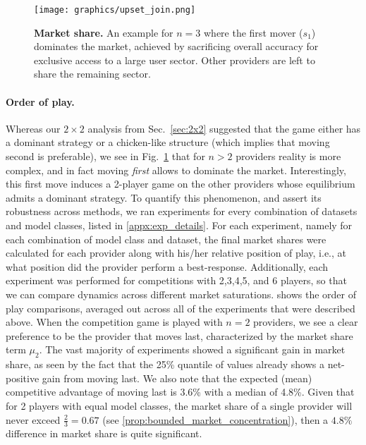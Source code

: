 



\begin{figure}[t!]
\centering
\texttt{[image: graphics/upset\_join.png]}
\caption{%
\textbf{Market share.}
An example for $n=3$ where the first mover ($s_1$) dominates the market,
achieved by sacrificing overall accuracy for exclusive access to a large user sector.
Other providers are left to share the remaining sector.
}
\label{fig:upset}
\end{figure}
 \paragraph{Order of play.}
Whereas our $2\times2$ analysis from Sec.~\ref{sec:2x2}
suggested that the game either has a dominant strategy or a chicken-like structure
(which implies that moving second is preferable),
we see in Fig.~\ref{fig:upset} that for $n>2$ providers  reality is more complex, and in fact moving \emph{first} allows to dominate the market. Interestingly, this first move induces a 2-player game on the other providers
whose equilibrium admits a dominant strategy.
To quantify this phenomenon, and assert its robustness across methods,  we ran experiments for every combination of datasets and model classes, listed in \cref{appx:exp_details}.
For each experiment, namely for each combination of model class and dataset, the final market shares were calculated for each provider along with his/her relative position of play, i.e., at what position did the provider perform a best-response. Additionally, each experiment was performed for competitions with 2,3,4,5, and 6  players, so that we can compare dynamics across different market saturations.
 shows the order of play comparisons, averaged out across all of the experiments that were described above. 
When the competition game is played with $n=2$ providers, we see a clear preference to be the provider that moves last, characterized by the market share term $\mu_2$.
The vast majority of experiments showed a significant gain in market share, as seen by the fact that the 25\% quantile of values already shows a net-positive gain from moving last. We also note that the expected (mean) competitive advantage of moving last is 3.6\% with a median of 4.8\%.
Given that for 2 players with equal model classes, the market share of a single provider will never exceed $\frac{2}{3} = 0.67$ (see \cref{prop:bounded_market_concentration}), then a $4.8\%$ difference in market share is  quite significant.


